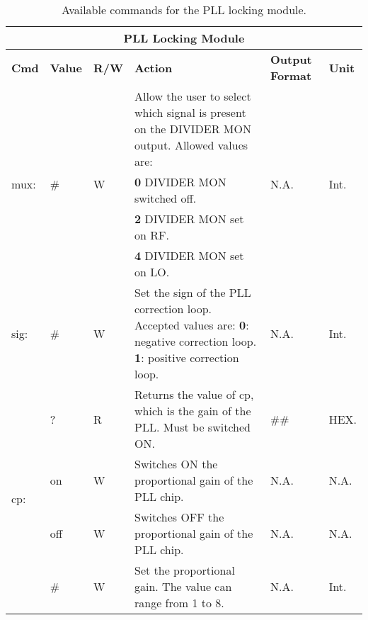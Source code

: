 \begin{center}
    \begin{longtable}{| m{} | m{} | m{} | m{} | m{}| m{} |}
    \caption{Available commands for the PLL locking module.\label{\QubeModel _cmd_table_pll}}\\
    \hline
    \multicolumn{6}{|c|}{\textbf{PLL Locking Module}} \\
    \hline \hline    
    \textbf{Cmd} & \textbf{Value} & \textbf{R/W} & \textbf{Action} & \textbf{Output \newline Format} & \textbf{Unit} \\
    \hline
    
    \multirow{4}{0.1\textwidth}{mux:}   & \multirow{4}{0.1\textwidth}{\#} & \multirow{4}{0.1\textwidth}{W} & Allow the user to select which signal is present on the DIVIDER MON output. Allowed values are: &                                                                                                                               \multirow{4}{0.1\textwidth}{N.A.} & \multirow{4}{0.1\textwidth}{Int.} \\
                                        &    &   & \textbf{0}    DIVIDER MON switched off.    & & \\
                                        &    &   & \textbf{2}    DIVIDER MON set on RF.       & & \\
                                        &    &   & \textbf{4}    DIVIDER MON set on LO.       & & \\
    \hline
    
    sig: & \# & W & Set the sign of the PLL correction loop. Accepted values are:
            \newline \textbf{0}: negative correction loop.
            \newline \textbf{1}: positive correction loop. & N.A. & Int. \\
    \hline
    
    \multirow{4}{0.1\textwidth}{cp:}    & ? & R & Returns the value of cp, which is the gain of the PLL. Must be switched ON. & \#\# & HEX. \\
                                        \cline{2-6}
                                        & on & W & Switches ON the proportional gain of the PLL chip. & N.A. & N.A. \\
                                        \cline{2-6}
                                        & off & W & Switches OFF the proportional gain of the PLL chip. & N.A. & N.A. \\
                                        \cline{2-6}
                                        & \# & W & Set the proportional gain. The value can range from 1 to 8. & N.A. & Int. \\
    \hline
    

\end{longtable}
\end{center}
